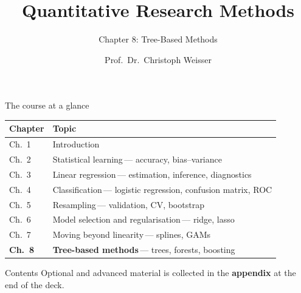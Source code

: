 \documentclass[aspectratio=169,11pt]{beamer}
\title{Quantitative Research Methods}
\subtitle{Chapter 8: Tree-Based Methods}
\author{Prof.\ Dr.\ Christoph Weisser}
\date{}\graphicspath{{images/}}
\begin{document}
\begin{frame}[plain]\titlepage\end{frame}

\begin{frame}{The course at a glance}
  \vspace{-1.5mm}
  \begin{center}
  \scriptsize
  \setlength{\tabcolsep}{5pt}
  \renewcommand{\arraystretch}{1.30}
  \begin{tabular}{@{\hspace{2pt}}l >{\raggedright\arraybackslash}p{}@{\hspace{2pt}}}
    \toprule
    \textbf{Chapter} & \textbf{Topic} \\
    \midrule
     {\color{accent}Ch.\ 1} & Introduction \\
    \rowcolor{black!3} {\color{accent}Ch.\ 2} & Statistical learning\,{\color{black!45}--- accuracy, bias--variance} \\
     {\color{accent}Ch.\ 3} & Linear regression\,{\color{black!45}--- estimation, inference, diagnostics} \\
    \rowcolor{black!3} {\color{accent}Ch.\ 4} & Classification\,{\color{black!45}--- logistic regression, confusion matrix, ROC} \\
     {\color{accent}Ch.\ 5} & Resampling\,{\color{black!45}--- validation, CV, bootstrap} \\
    \rowcolor{black!3} {\color{accent}Ch.\ 6} & Model selection and regularisation\,{\color{black!45}--- ridge, lasso} \\
     {\color{accent}Ch.\ 7} & Moving beyond linearity\,{\color{black!45}--- splines, GAMs} \\
    \rowcolor{accent!18} \textbf{Ch.\ 8} & \textbf{Tree-based methods}\,{\color{accent!75!black}--- trees, forests, boosting} \\
    \bottomrule
  \end{tabular}
  \end{center}
\end{frame}


\begin{frame}{Contents}\small
  \tableofcontents[hideallsubsections]
  \vfill
  {\tiny Optional and advanced material is collected in the \textbf{appendix} at the end of the deck.}
\end{frame}
\end{document}
